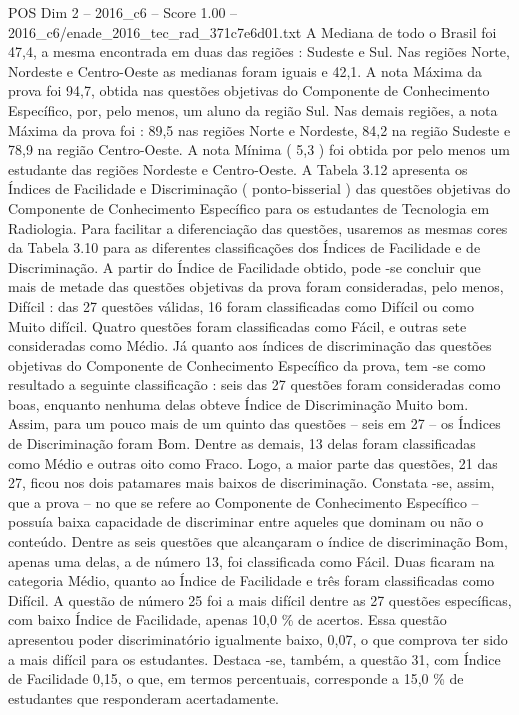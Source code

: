 \begin{textsample}{POS Dim 2 – 2016\_c6 – Score 1.00 – 2016\_c6/enade\_2016\_tec\_rad\_371c7e6d01.txt}
A Mediana de todo o Brasil foi 47,4, a mesma encontrada em duas das regiões : Sudeste e Sul.
Nas regiões Norte, Nordeste e Centro-Oeste as medianas foram iguais e 42,1.
A nota Máxima da prova foi 94,7, obtida nas questões objetivas do Componente de Conhecimento Específico, por, pelo menos, um aluno da região Sul.
Nas demais regiões, a nota Máxima da prova foi : 89,5 nas regiões Norte e Nordeste, 84,2 na região Sudeste e 78,9 na região Centro-Oeste.
A nota Mínima ( 5,3 ) foi obtida por pelo menos um estudante das regiões Nordeste e Centro-Oeste.
A Tabela 3.12 apresenta os Índices de Facilidade e Discriminação ( ponto-bisserial ) das questões objetivas do Componente de Conhecimento Específico para os estudantes de Tecnologia em Radiologia.
Para facilitar a diferenciação das questões, usaremos as mesmas cores da Tabela 3.10 para as diferentes classificações dos Índices de Facilidade e de Discriminação.
A partir do Índice de Facilidade obtido, pode -se concluir que mais de metade das questões objetivas da prova foram consideradas, pelo menos, Difícil : das 27 questões válidas, 16 foram classificadas como Difícil ou como Muito difícil.
Quatro questões foram classificadas como Fácil, e outras sete consideradas como Médio.
Já quanto aos índices de discriminação das questões objetivas do Componente de Conhecimento Específico da prova, tem -se como resultado a seguinte classificação : seis das 27 questões foram consideradas como boas, enquanto nenhuma delas obteve Índice de Discriminação Muito bom.
Assim, para um pouco mais de um quinto das questões – seis em 27 – os Índices de Discriminação foram Bom.
Dentre as demais, 13 delas foram classificadas como Médio e outras oito como Fraco.
Logo, a maior parte das questões, 21 das 27, ficou nos dois patamares mais baixos de discriminação.
Constata -se, assim, que a prova – no que se refere ao Componente de Conhecimento Específico – possuía baixa capacidade de discriminar entre aqueles que dominam ou não o conteúdo.
Dentre as seis questões que alcançaram o índice de discriminação Bom, apenas uma delas, a de número 13, foi classificada como Fácil.
Duas ficaram na categoria Médio, quanto ao Índice de Facilidade e três foram classificadas como Difícil.
A questão de número 25 foi a mais difícil dentre as 27 questões específicas, com baixo Índice de Facilidade, apenas 10,0 \% de acertos.
Essa questão apresentou poder discriminatório igualmente baixo, 0,07, o que comprova ter sido a mais difícil para os estudantes.
Destaca -se, também, a questão 31, com Índice de Facilidade 0,15, o que, em termos percentuais, corresponde a 15,0 \% de estudantes que responderam acertadamente.

\end{textsample}
